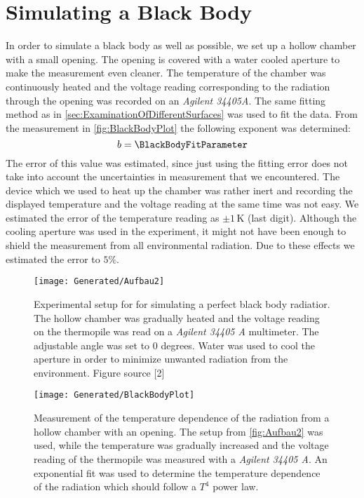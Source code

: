 \documentclass[a4paper,10pt,twocolumn]{article}
\begin{document}
    \section{Simulating a Black Body}\label{sec:BlackBodyRadiation}
    In order to simulate a black body as well as possible, we set up a hollow chamber with a small opening.
    The opening is covered with a water cooled aperture to make the measurement even cleaner.
    The temperature of the chamber was continuously heated and the voltage reading corresponding to the radiation through the opening was recorded on an \textit{Agilent 34405A}.
    The same fitting method as in \autoref{sec:ExaminationOfDifferentSurfaces} was used to fit the data.
    From the measurement in \autoref{fig:BlackBodyPlot} the following exponent was determined:
    \begin{equation}
        b = \BlackBodyFitParameter
    \end{equation}
    The error of this value was estimated, since just using the fitting error does not take into account the uncertainties in measurement that we encountered.
    The device which we used to heat up the chamber was rather inert and recording the displayed temperature and the voltage reading at the same time was not easy.
    We estimated the error of the temperature reading as $\pm 1\,$K (last digit).
    Although the cooling aperture was used in the experiment, it might not have been enough to shield the measurement from all environmental radiation.
    Due to these effects we estimated the error to $5\%$\).
    \begin{figure}
        \begin{center}
            \texttt{[image: Generated/Aufbau2]}
            \caption{Experimental setup for for simulating a perfect black body radiatior. The hollow chamber was gradually heated 
            and the voltage reading on the thermopile was read on a \textit{Agilent 34405 A} multimeter. The adjustable angle was set to 0 degrees.
            Water was used to cool the aperture in order to minimize unwanted radiation from the environment.
            Figure source [2]}
            \label{fig:Aufbau2}
        \end{center}
    \end{figure}
    \begin{figure}
        \begin{center}
            \texttt{[image: Generated/BlackBodyPlot]}
            \caption{Measurement of the temperature dependence of the radiation from a hollow chamber with an opening.
            The setup from \autoref{fig:Aufbau2} was used, while the temperature was gradually increased and the voltage reading of the thermopile
            was measured with a \textit{Agilent 34405 A}.
            An exponential fit was used to determine the temperature dependence of the radiation which should follow a $T^4$ power law.}
            \label{fig:BlackBodyPlot}
        \end{center}
    \end{figure}
\end{document}
